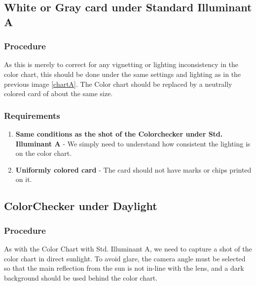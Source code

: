 \documentclass[twoside]{article}
\begin{document}
\subsection{White or Gray card under Standard Illuminant A}

\subsubsection{Procedure}
As this is merely to correct for any vignetting or lighting inconsistency in the color chart, this should be done under the same settings and lighting as in the previous image \ref{chartA}. The Color chart should be replaced by a neutrally colored card of about the same size.

\subsubsection{Requirements}
\begin{enumerate}
    \item \textbf{Same conditions as the shot of the Colorchecker under Std. Illuminant A} - We simply need to understand how consistent the lighting is on the color chart.
    \item \textbf{Uniformly colored card} - The card should not have marks or chips printed on it.
\end{enumerate}


\subsection{ColorChecker under Daylight}

\subsubsection{Procedure}
As with the Color Chart with Std. Illuminant A, we need to capture a shot of the color chart in direct sunlight. To avoid glare, the camera angle must be selected so that the main reflection from the sun is not in-line with the lens, and a dark background should be used behind the color chart.
\end{document}
